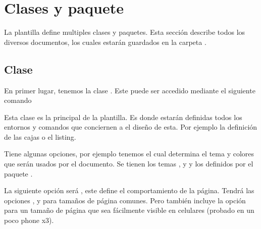 \documentclass[theme=mocha, pagecolor, pagesize=a5paper, stretchmode=true]{qx-files/qx-notes}
\title{\texpkgname{qx-files}}
\author{Qx}
\date{\today}
\begin{document}
  \maketitle




  \begin{abstract}
    El objetivo de esta plantilla es definir una serie de macros y herramientas con el objetivo de la creación de notas matemáticas o de programación de manera simple.

    Incluye varias opciones para la customization de la apariencia. También, estará modularizado, por lo que si solo se requiere una porción de los comandos, basta con cargar el paquete que lo contenga únicamente.
  \end{abstract}



  \section{Clases y paquete}

  La plantilla define multiples clases y paquetes. Esta sección describe todos los diversos documentos, los cuales estarán guardados en la carpeta .



  \subsection{Clase }

  En primer lugar, tenemos la clase . Este puede ser accedido mediante el siguiente comando

  Esta clase es la principal de la plantilla. Es donde estarán definidas todos los entornos y comandos que conciernen a el diseño de esta. Por ejemplo la definición de las cajas o el listing.

  Tiene algunas opciones, por ejemplo tenemos  el cual determina el tema y colores que serán usados por el documento. Se tienen los temas ,  y  y los definidos por el paquete .

  La siguiente opción será , este define el comportamiento de la página. Tendrá las opciones ,  y  para tamaños de página comunes. Pero también incluye la opción  para un tamaño de página que sea fácilmente visible en celulares (probado en un poco phone x3).
\end{document}

